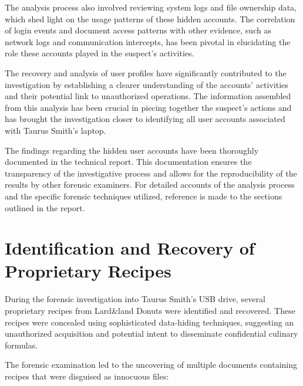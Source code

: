 The analysis process also involved reviewing system logs and file ownership data, which shed light on the usage patterns of these hidden accounts. The correlation of login events and document access patterns with other evidence, such as network logs and communication intercepts, has been pivotal in elucidating the role these accounts played in the suspect's activities.

The recovery and analysis of user profiles have significantly contributed to the investigation by establishing a clearer understanding of the accounts' activities and their potential link to unauthorized operations. The information assembled from this analysis has been crucial in piecing together the suspect's actions and has brought the investigation closer to identifying all user accounts associated with Taurus Smith's laptop.

The findings regarding the hidden user accounts have been thoroughly documented in the technical report. This documentation ensures the transparency of the investigative process and allows for the reproducibility of the results by other forensic examiners. For detailed accounts of the analysis process and the specific forensic techniques utilized, reference is made to the sections outlined in the report.

\section{Identification and Recovery of Proprietary Recipes}
During the forensic investigation into Taurus Smith's USB drive, several proprietary recipes from Lard\&land Donuts were identified and recovered. These recipes were concealed using sophisticated data-hiding techniques, suggesting an unauthorized acquisition and potential intent to disseminate confidential culinary formulas.

The forensic examination led to the uncovering of multiple documents containing recipes that were disguised as innocuous files:

